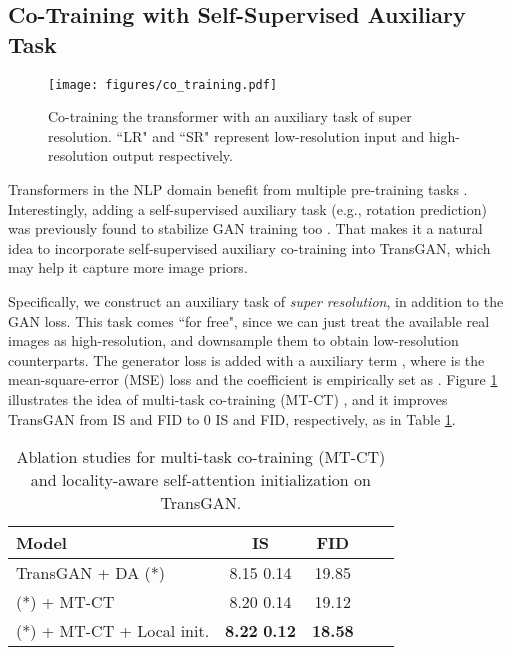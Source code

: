 \documentclass{article}
\begin{document}
\subsection{Co-Training with Self-Supervised Auxiliary Task}
\begin{figure}[h]
\begin{center}
\texttt{[image: figures/co\_training.pdf]}
\end{center}
\vspace{-1em}
\caption{Co-training the transformer  with an auxiliary task of super resolution. ``LR" and ``SR" represent low-resolution input and high-resolution output respectively.}
\vspace{-0.5em}
\label{fig:co_training}
\end{figure}


Transformers in the NLP domain benefit from multiple pre-training tasks \cite{devlin2018bert,song2020mpnet}. Interestingly, adding a self-supervised auxiliary task (e.g., rotation prediction) was previously found to stabilize GAN training too \cite{chen2019self}. That makes it a natural idea to incorporate self-supervised auxiliary co-training into TransGAN, which may help it capture more image priors.





Specifically, we construct an auxiliary task of \textit{super resolution}, in addition to the GAN loss. This task comes ``for free", since we can just treat the available real images as high-resolution, and downsample them to obtain low-resolution counterparts.  The generator loss is added with a auxiliary term , where  is the mean-square-error (MSE) loss and the coefficient  is empirically set as . Figure \ref{fig:co_training} illustrates the idea of multi-task co-training (MT-CT) , and it improves TransGAN from  IS and  FID to 0 IS and  FID, respectively, as in Table \ref{table:ablation}. 

\begin{table}[h]
\vspace{-0.5em}
\caption{Ablation studies for multi-task co-training (MT-CT) and locality-aware self-attention initialization on TransGAN.}
\label{table:ablation}
\begin{center}
\begin{small}
\begin{sc}
\begin{tabular}{lcccr}
\toprule
Model &   IS & FID \\
\midrule
TransGAN + DA (*)     & 8.15 0.14& 19.85 \\

(*)  + MT-CT    & 8.20 0.14& 19.12 \\



(*)  + MT-CT + Local init.     & \textbf{8.22} \textbf{0.12}& \textbf{18.58} \\
\bottomrule
\end{tabular}
\end{sc}
\end{small}
\end{center}
\vspace{-1em}
\end{table}
\end{document}

